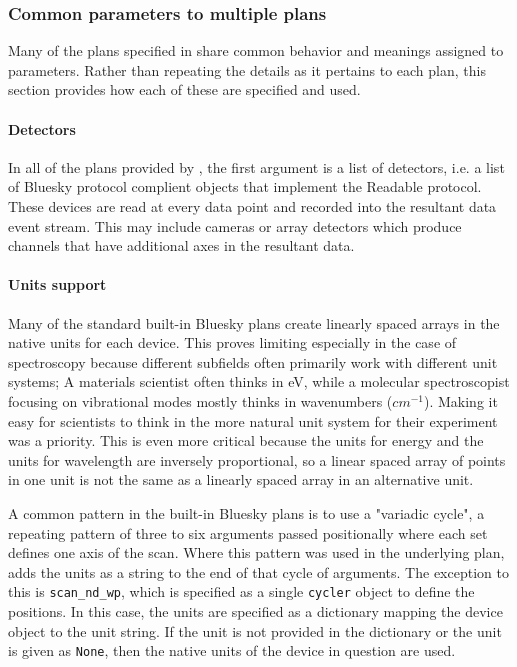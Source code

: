 \subsubsection{Common parameters to multiple plans}
\label{common_params}

Many of the plans specified in \wrightplans share common behavior and meanings assigned to parameters.
Rather than repeating the details as it pertains to each plan, this section provides how each of these are specified and used.

\paragraph{Detectors}

In all of the plans provided by \wrightplans, the first argument is a list of detectors, i.e. a list of Bluesky protocol complient objects that implement the Readable protocol.
These devices are read at every data point and recorded into the resultant data event stream.
This may include cameras or array detectors which produce channels that have additional axes in the resultant data.

\paragraph{Units support}

Many of the standard built-in Bluesky plans create linearly spaced arrays in the native units for each device.
This proves limiting especially in the case of spectroscopy because different subfields often primarily work with different unit systems; A materials scientist often thinks in eV, while a molecular spectroscopist focusing on vibrational modes mostly thinks in wavenumbers ($cm^{-1}$).
Making it easy for scientists to think in the more natural unit system for their experiment was a priority.
This is even more critical because the units for energy and the units for wavelength are inversely proportional, so a linear spaced array of points in one unit is not the same as a linearly spaced array in an alternative unit.

A common pattern in the built-in Bluesky plans is to use a "variadic cycle", a repeating pattern of three to six arguments passed positionally where each set defines one axis of the scan.
Where this pattern was used in the underlying plan, \wrightplans adds the units as a string to the end of that cycle of arguments.
The exception to this is \texttt{scan\_nd\_wp}, which is specified as a single \texttt{cycler}\cite{} object to define the positions.
In this case, the units are specified as a dictionary mapping the device object to the unit string.
If the unit is not provided in the dictionary or the unit is given as \texttt{None}, then the native units of the device in question are used.

